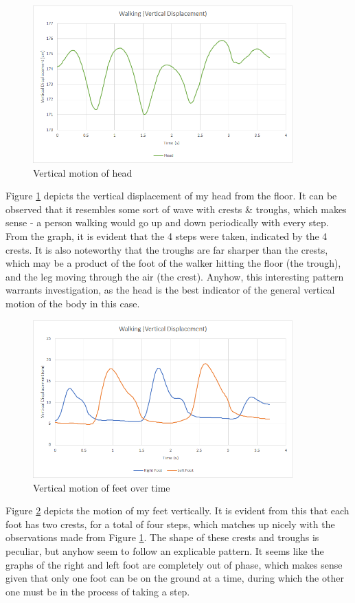 \documentclass[12pt, a4paper]{article}
\begin{document}
\begin{figure}[H]
    \centering
    \includegraphics[width=10cm]{head_vert.png}
    \caption{Vertical motion of head}
    \label{head_y}
\end{figure}

Figure \ref{head_y} depicts the vertical displacement of my head from the floor.
It can be observed that it resembles some sort of wave with crests \& troughs,
which makes sense - a person walking would go up and down periodically with
every step. From the graph, it is evident that the 4 steps were taken, indicated
by the 4 crests. It is also noteworthy that the troughs are far sharper than the
crests, which may be a product of the foot of the walker hitting the floor (the
trough), and the leg moving through the air (the crest). Anyhow, this
interesting pattern warrants investigation, as the head is the best indicator of
the general vertical motion of the body in this case.

\begin{figure}[H]
    \centering
    \includegraphics[width=10cm]{feet_vert.png}
    \caption{Vertical motion of feet over time}
    \label{feet_y}
\end{figure}

Figure \ref{feet_y} depicts the motion of my feet vertically. It is evident from
this that each foot has two crests, for a total of four steps, which matches up
nicely with the observations made from Figure \ref{head_y}. The shape of these
crests and troughs is peculiar, but anyhow seem to follow an explicable pattern.
It seems like the graphs of the right and left foot are completely out of phase,
which makes sense given that only one foot can be on the ground at a time,
during which the other one must be in the process of taking a step. \\
\end{document}
